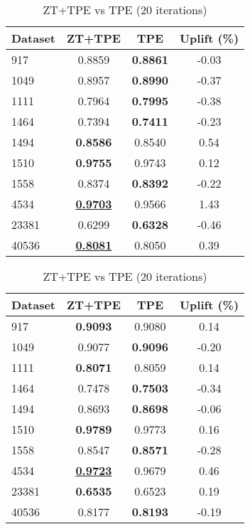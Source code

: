 \begin{table}[htbp]
\begin{center}
\begin{small}
\begin{sc}
\begin{subtable}[t]{0.48\textwidth}
    \centering
    \caption{ZT+TPE vs TPE (10 iterations)}
    \label{tab:decisiontree-optuna-10}
    \begin{tabular}{lccc}
    \toprule
    \textbf{Dataset} & \textbf{ZT+TPE} & \textbf{TPE} & \textbf{Uplift (\%)} \\
    \midrule
    917    & 0.8859 & \textbf{0.8861} & -0.03 \\
    1049    & 0.8957 & \textbf{0.8990} & -0.37 \\
    1111    & 0.7964 & \textbf{0.7995} & -0.38 \\
    1464    & 0.7394 & \textbf{0.7411} & -0.23 \\
    1494    & \textbf{0.8586} & 0.8540 & 0.54 \\
    1510    & \textbf{0.9755} & 0.9743 & 0.12 \\
    1558    & 0.8374 & \textbf{0.8392} & -0.22 \\
    4534    & \underline{\textbf{0.9703}} & 0.9566 & 1.43 \\
    23381    & 0.6299 & \textbf{0.6328} & -0.46 \\
    40536    & \underline{\textbf{0.8081}} & 0.8050 & 0.39 \\
    \bottomrule
    \end{tabular}
\end{subtable}
\hfill
\begin{subtable}[t]{0.48\textwidth}
    \centering
    \caption{ZT+TPE vs TPE (20 iterations)}
    \label{tab:decisiontree-optuna-20}
    \begin{tabular}{lccc}
    \toprule
    \textbf{Dataset} & \textbf{ZT+TPE} & \textbf{TPE} & \textbf{Uplift (\%)} \\
    \midrule
    917    & \textbf{0.9093} & 0.9080 & 0.14 \\
    1049    & 0.9077 & \textbf{0.9096} & -0.20 \\
    1111    & \textbf{0.8071} & 0.8059 & 0.14 \\
    1464    & 0.7478 & \textbf{0.7503} & -0.34 \\
    1494    & 0.8693 & \textbf{0.8698} & -0.06 \\
    1510    & \textbf{0.9789} & 0.9773 & 0.16 \\
    1558    & 0.8547 & \textbf{0.8571} & -0.28 \\
    4534    & \underline{\textbf{0.9723}} & 0.9679 & 0.46 \\
    23381    & \textbf{0.6535} & 0.6523 & 0.19 \\
    40536    & 0.8177 & \textbf{0.8193} & -0.19 \\
    \bottomrule
    \end{tabular}
\end{subtable}

\end{sc}
\end{small}
\end{center}
\vskip -0.1in
\end{table}